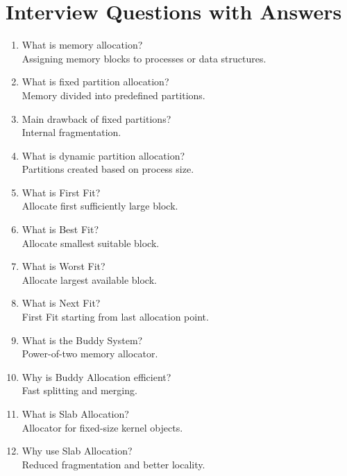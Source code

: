 \section{Interview Questions with Answers}

\begin{enumerate}
\item What is memory allocation?\\
Assigning memory blocks to processes or data structures.

\item What is fixed partition allocation?\\
Memory divided into predefined partitions.

\item Main drawback of fixed partitions?\\
Internal fragmentation.

\item What is dynamic partition allocation?\\
Partitions created based on process size.

\item What is First Fit?\\
Allocate first sufficiently large block.

\item What is Best Fit?\\
Allocate smallest suitable block.

\item What is Worst Fit?\\
Allocate largest available block.

\item What is Next Fit?\\
First Fit starting from last allocation point.

\item What is the Buddy System?\\
Power-of-two memory allocator.

\item Why is Buddy Allocation efficient?\\
Fast splitting and merging.

\item What is Slab Allocation?\\
Allocator for fixed-size kernel objects.

\item Why use Slab Allocation?\\
Reduced fragmentation and better locality.


\end{enumerate}

